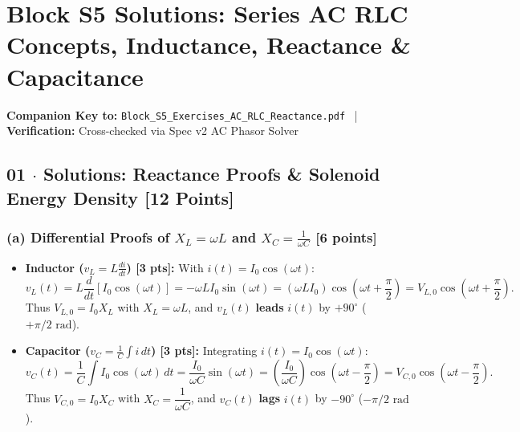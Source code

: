 \documentclass[10pt,letterpaper]{article}
\begin{document}
\section*{Block S5 Solutions: Series AC RLC Concepts, Inductance, Reactance \& Capacitance}

  \textbf{Companion Key to:} \texttt{Block\_S5\_Exercises\_AC\_RLC\_Reactance.pdf} ~|~
  \textbf{Verification:} Cross-checked via Spec v2 AC Phasor Solver


\subsection*{01 $\cdot$ Solutions: Reactance Proofs \& Solenoid Energy Density \hfill [12 Points]}


  \subsubsection*{(a) Differential Proofs of $X_L = \omega L$ and $X_C = \frac{1}{\omega C}$ [6 points]}
  \begin{itemize}
    \item \textbf{Inductor ($v_L = L\frac{di}{dt}$) [3 pts]:} With $i(t) = I_0\cos(\omega t)$:
    $$v_L(t) = L\frac{d}{dt}[I_0\cos(\omega t)] = -\omega L I_0 \sin(\omega t) = (\omega L I_0)\cos\left(\omega t + \frac{\pi}{2}\right) = V_{L,0}\cos\left(\omega t + \frac{\pi}{2}\right).$$
    Thus $V_{L,0} = I_0 X_L$ with $X_L = \omega L$, and $v_L(t)$ \textbf{leads} $i(t)$ by $+90^\circ$ ($+\pi/2\text{ rad}$).
    \item \textbf{Capacitor ($v_C = \frac{1}{C}\int i\,dt$) [3 pts]:} Integrating $i(t) = I_0\cos(\omega t)$:
    $$v_C(t) = \frac{1}{C}\int I_0\cos(\omega t)\,dt = \frac{I_0}{\omega C}\sin(\omega t) = \left(\frac{I_0}{\omega C}\right)\cos\left(\omega t - \frac{\pi}{2}\right) = V_{C,0}\cos\left(\omega t - \frac{\pi}{2}\right).$$
    Thus $V_{C,0} = I_0 X_C$ with $X_C = \dfrac{1}{\omega C}$, and $v_C(t)$ \textbf{lags} $i(t)$ by $-90^\circ$ ($-\pi/2\text{ rad}$).
  \end{itemize}
\end{document}

